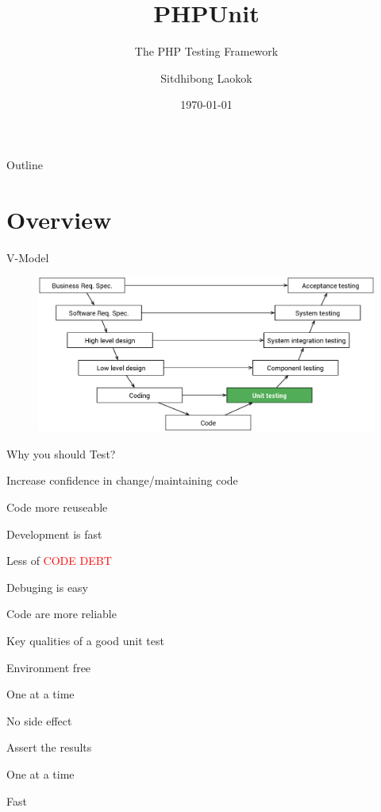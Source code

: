\documentclass[14pt]{beamer}
\title{PHPUnit}
\subtitle{The PHP Testing Framework}
\author{Sitdhibong Laokok}
\institute{Computer Engineering}
\date{\today}
\begin{document}
\begin{frame}[plain]
\maketitle
\end{frame}

\begin{frame}[plain]{Outline}
    \tableofcontents
\end{frame}

\section{Overview}
\begin{frame}[plain]{V-Model}
    \begin{figure}
        \center
        \includegraphics[width=\textwidth]{v-model}
    \end{figure}
\end{frame}

\begin{frame}[plain]{Why you should Test?}
    \begin{fullpageitemize}
        \item<1-> Increase confidence in change/maintaining code 
        \item<2-> Code more reuseable 
        \item<3-> Development is fast
        \item<4-> Less of \textcolor{red}{CODE DEBT}
        \item<5-> Debuging is easy
        \item<6-> Code are more reliable
    \end{fullpageitemize}
\end{frame}

\begin{frame}[plain]{Key qualities of a good unit test}
    \begin{fullpageitemize}
        \item<1-> Environment free
        \item<2-> One at a time
        \item<3-> No side effect
        \item<4-> Assert the results
        \item<5-> One at a time
        \item<6-> Fast
    \end{fullpageitemize}
\end{frame}
\end{document}
